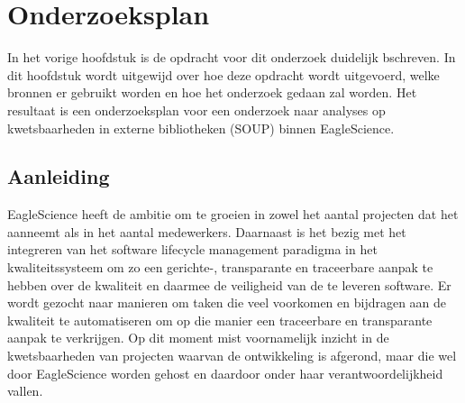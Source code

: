 \chapter{Onderzoeksplan}\label{ch:onderzoekPlan}

In het vorige hoofdstuk is de opdracht voor dit onderzoek duidelijk bschreven. In dit hoofdstuk wordt uitgewijd over hoe deze opdracht wordt uitgevoerd, welke bronnen er gebruikt worden en hoe het onderzoek gedaan zal worden. Het resultaat is een onderzoeksplan voor een onderzoek naar analyses op kwetsbaarheden in externe bibliotheken (SOUP) binnen EagleScience.

\section{Aanleiding}\label{sec:OP_aanleiding}
EagleScience heeft de ambitie om te groeien in zowel het aantal projecten dat het aanneemt als in het aantal medewerkers. Daarnaast is het bezig met het integreren van het software lifecycle management paradigma in het kwaliteitssysteem om zo een gerichte-, transparante en traceerbare aanpak te hebben over de kwaliteit en daarmee de veiligheid van de te leveren software. Er wordt gezocht naar manieren om taken die veel voorkomen en bijdragen aan de kwaliteit te automatiseren om op die manier een traceerbare en transparante aanpak te verkrijgen. Op dit moment mist voornamelijk inzicht in de kwetsbaarheden van projecten waarvan de ontwikkeling is afgerond, maar die wel door EagleScience worden gehost en daardoor onder haar verantwoordelijkheid vallen.

